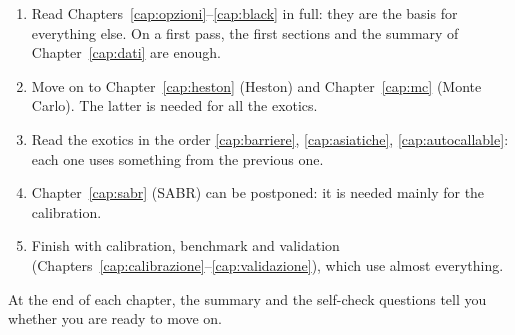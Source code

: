 \begin{enumerate}
\item Read Chapters~\ref{cap:opzioni}--\ref{cap:black} in full: they are the basis for everything else. On a first
pass, the first sections and the summary of Chapter~\ref{cap:dati} are enough.
\item Move on to Chapter~\ref{cap:heston} (Heston) and Chapter~\ref{cap:mc} (Monte Carlo). The latter is needed for
all the exotics.
\item Read the exotics in the order \ref{cap:barriere}, \ref{cap:asiatiche}, \ref{cap:autocallable}: each one uses
something from the previous one.
\item Chapter~\ref{cap:sabr} (SABR) can be postponed: it is needed mainly for the calibration.
\item Finish with calibration, benchmark and validation (Chapters~\ref{cap:calibrazione}--\ref{cap:validazione}),
which use almost everything.
\end{enumerate}

At the end of each chapter, the summary and the self-check questions tell you whether you are ready to move on.

